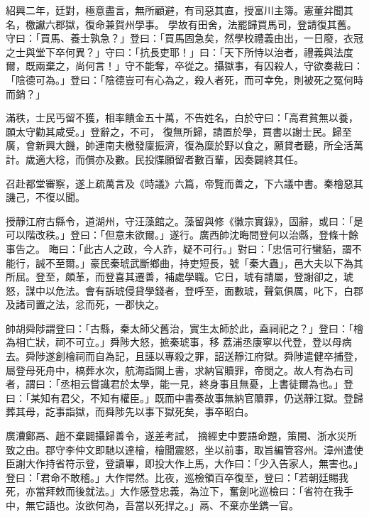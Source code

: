 \begin{pinyinscope}
 紹興二年，廷對，極意盡言，無所顧避，有司惡其直，授富川主簿。憲董弅聞其名，檄讞六郡獄，復命兼賀州學事。
 學故有田舍，法罷歸買馬司，登請復其舊。守曰：「買馬、養士孰急？」登曰：「買馬固急矣，然學校禮義由出，一日廢，衣冠之士與堂下卒何異？」守曰：「抗長吏耶！」曰：「天下所恃以治者，禮義與法度爾，既兩棄之，尚何言！」守不能奪，卒從之。攝獄事，有囚殺人，守欲奏裁曰：「陰德可為。」登曰：「陰德豈可有心為之，殺人者死，而可幸免，則被死之冤何時而銷？」



 滿秩，士民丐留不獲，相率饋金五十萬，不告姓名，白於守曰：「高君貧無以養，願太守勸其咸受。」登辭之，不可，
 復無所歸，請置於學，買書以謝士民。歸至廣，會新興大饑，帥連南夫檄發廩振濟，復為糜於野以食之，願貸者聽，所全活萬計。歲適大稔，而償亦及數。民投牒願留者數百輩，因奏闢終其任。



 召赴都堂審察，遂上疏萬言及《時議》六篇，帝覽而善之，下六議中書。秦檜惡其譏己，不復以聞。



 授靜江府古縣令，道湖州，守汪藻館之。藻留與修《徽宗實錄》，固辭，或曰：「是可以階改秩。」登曰：「但意未欲爾。」遂行。廣西帥沈晦問登何以治縣，登條十餘事告之。
 晦曰：「此古人之政，今人詐，疑不可行。」對曰：「忠信可行蠻貊，謂不能行，誠不至爾。」豪民秦琥武斷鄉曲，持吏短長，號「秦大蟲」，邑大夫以下為其所屈。登至，頗革，而登喜其遷善，補處學職。它日，琥有請屬，登謝卻之，琥怒，謀中以危法。會有訴琥侵貸學錢者，登呼至，面數琥，聲氣俱厲，叱下，白郡及諸司置之法，忿而死，一郡快之。



 帥胡舜陟謂登曰：「古縣，秦太師父舊治，實生太師於此，盍祠祀之？」登曰：「檜為相亡狀，祠不可立。」舜陟大怒，摭秦琥事，移
 荔浦丞康寧以代登，登以母病去。舜陟遂創檜祠而自為記，且誣以專殺之罪，詔送靜江府獄。舜陟遣健卒捕登，屬登母死舟中，槁葬水次，航海詣闕上書，求納官贖罪，帝閔之。故人有為右司者，謂曰：「丞相云嘗識君於太學，能一見，終身事且無憂，上書徒爾為也。」登曰：「某知有君父，不知有權臣。」既而中書奏故事無納官贖罪，仍送靜江獄。登歸葬其母，訖事詣獄，而舜陟先以事下獄死矣，事卒昭白。



 廣漕鄭鬲、趙不棄闢攝歸善令，遂差考試，
 摘經史中要語命題，策閩、浙水災所致之由。郡守李仲文即馳以達檜，檜聞震怒，坐以前事，取旨編管容州。漳州遣使臣謝大作持省符示登，登讀畢，即投大作上馬，大作曰：「少入告家人，無害也。」登曰：「君命不敢稽。」大作愕然。比夜，巡檢領百卒復至，登曰：「若朝廷賜我死，亦當拜敕而後就法。」大作感登忠義，為泣下，奮劍叱巡檢曰：「省符在我手中，無它語也。汝欲何為，吾當以死捍之。」鬲、不棄亦坐鐫一官。




\end{pinyinscope}
